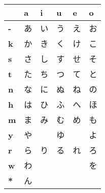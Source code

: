 


\bigskip
\begin{center}	
\Huge

\begin{tabular}{m{1.0cm}||m{1.0cm}|m{1.0cm}|m{1.0cm}|m{1.0cm}|m{1.0cm}|}
& \textbf{a}& \textbf{i}& \textbf{u}& \textbf{e}& \textbf{o}\\ \hline \hline 
\textbf{-}&\smallskip あ&\smallskip い&\smallskip う&\smallskip え&\smallskip お\\ \hline 
\textbf{k}&\smallskip か&\smallskip き&\smallskip く&\smallskip け&\smallskip こ\\ \hline 
\textbf{s}&\smallskip さ&\smallskip し&\smallskip す&\smallskip せ&\smallskip そ\\ \hline 
\textbf{t}&\smallskip た&\smallskip ち&\smallskip つ&\smallskip て&\smallskip と\\ \hline 
\textbf{n}&\smallskip な&\smallskip に&\smallskip ぬ&\smallskip ね&\smallskip の\\ \hline 
\textbf{h}&\smallskip は&\smallskip ひ&\smallskip ふ&\smallskip へ&\smallskip ほ\\ \hline 
\textbf{m}&\smallskip ま&\smallskip み&\smallskip む&\smallskip め&\smallskip も\\ \hline 
\textbf{y}&\smallskip や&\smallskip   &\smallskip ゆ&\smallskip   &\smallskip よ\\ \hline 
\textbf{r}&\smallskip ら&\smallskip り&\smallskip る&\smallskip れ&\smallskip ろ\\ \hline 
\textbf{w}&\smallskip わ&\smallskip   &\smallskip   &\smallskip   &\smallskip を\\ \hline 
\textbf{*}&\smallskip ん&\smallskip   &\smallskip   &\smallskip   &\smallskip   \\ \hline 
\end{tabular}
\end{center}
